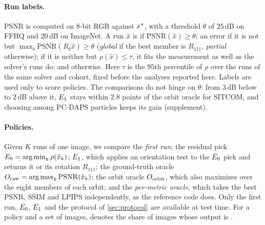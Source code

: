 \paragraph{Run labels.}
PSNR is computed on 8-bit RGB against $x^\star$, with a threshold $\theta$ of $25$\,dB on FFHQ and $20$\,dB on ImageNet.
A run $\hat x$ is
\good if $\mathrm{PSNR}(\hat x)\ge\theta$;
an \orbit error if it is not \good but $\max_b\mathrm{PSNR}(R_b\hat x)\ge\theta$ (\emph{global} if the best member is $R_{111}$, \emph{partial} otherwise);
\cons if it is neither but $\rho(\hat x)\le\tau$, \ie it fits the measurement as well as the solver's \good runs do;
and \incons otherwise.
Here $\tau$ is the $95$th percentile of $\rho$ over the \good runs of the same solver and cohort, fixed before the analyses reported here.
Labels are used only to score policies.
The comparisons do not hinge on $\theta$: from $3$\,dB below to $2$\,dB above it, $E_1$ stays within $2.8$ points of the orbit oracle for SITCOM, and choosing among PC-DAPS particles keeps its gain (supplement).

\paragraph{Policies.}
Given $K$ runs of one image, we compare
the \emph{first run};
the residual pick $E_0=\operatorname*{arg\,min}_k\rho(\hat x_k)$;
$E_1$, which applies an orientation test to the $E_0$ pick and returns it or its rotation $R_{111}$;
the ground-truth oracle $O_{\mathrm{raw}}=\operatorname*{arg\,max}_k\mathrm{PSNR}(\hat x_k)$;
the orbit oracle $O_{\mathrm{orbit}}$, which also maximizes over the eight members of each orbit;
and the \emph{per-metric oracle}, which takes the best PSNR, SSIM and LPIPS independently, as the reference code does.
Only the first run, $E_0$, $E_1$ and the protocol of \cref{sec:protocol} are available at test time.
For a policy and a set of images, \good denotes the share of images whose output is \good.

